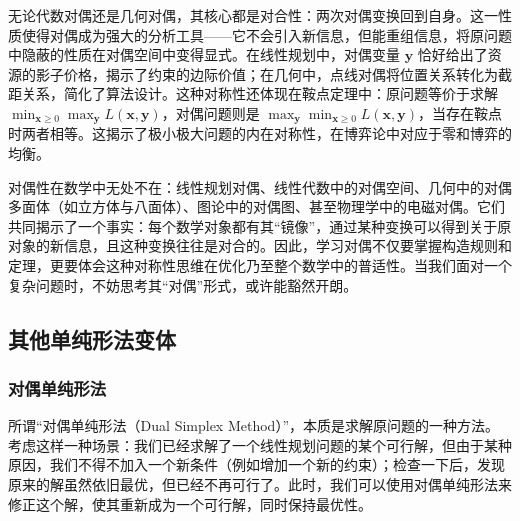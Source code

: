 \documentclass[12pt]{article}
\theoremstyle{plain}
\theoremstyle{definition}
\begin{document}
无论代数对偶还是几何对偶，其核心都是对合性：两次对偶变换回到自身。这一性质使得对偶成为强大的分析工具——它不会引入新信息，但能重组信息，将原问题中隐蔽的性质在对偶空间中变得显式。在线性规划中，对偶变量 $\bm{y}$ 恰好给出了资源的影子价格，揭示了约束的边际价值；在几何中，点线对偶将位置关系转化为截距关系，简化了算法设计。这种对称性还体现在鞍点定理中：原问题等价于求解 $\displaystyle \min_{\bm{x}\ge0} \max_{\bm{y}} L(\bm{x},\bm{y})$，对偶问题则是 $\displaystyle \max_{\bm{y}} \min_{\bm{x}\ge0} L(\bm{x},\bm{y})$，当存在鞍点时两者相等。这揭示了极小极大问题的内在对称性，在博弈论中对应于零和博弈的均衡。

对偶性在数学中无处不在：线性规划对偶、线性代数中的对偶空间、几何中的对偶多面体（如立方体与八面体）、图论中的对偶图、甚至物理学中的电磁对偶。它们共同揭示了一个事实：每个数学对象都有其“镜像”，通过某种变换可以得到关于原对象的新信息，且这种变换往往是对合的。因此，学习对偶不仅要掌握构造规则和定理，更要体会这种对称性思维在优化乃至整个数学中的普适性。当我们面对一个复杂问题时，不妨思考其“对偶”形式，或许能豁然开朗。

\subsection{其他单纯形法变体}\label{subsec:other_simplex_variants}

\subsubsection{对偶单纯形法}\label{subsubsec:dual_simplex}

所谓“对偶单纯形法（Dual Simplex Method）”，本质是求解原问题的一种方法。考虑这样一种场景：我们已经求解了一个线性规划问题的某个可行解，但由于某种原因，我们不得不加入一个新条件（例如增加一个新的约束）；检查一下后，发现原来的解虽然依旧最优，但已经不再可行了。此时，我们可以使用对偶单纯形法来修正这个解，使其重新成为一个可行解，同时保持最优性。
\end{document}
